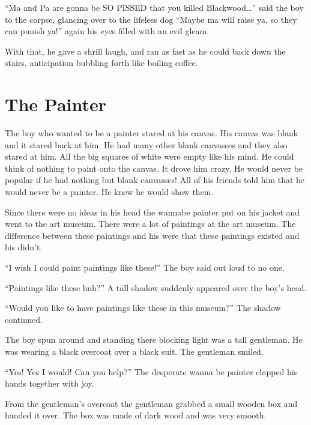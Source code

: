 ``Ma and Pa are gonna be SO PISSED that you killed Blackwood{\ldots}''
said the boy to the corpse, glancing over to the lifeless dog
``Maybe ma will raise ya, so they can punish ya!'' again his eyes
filled with an evil gleam.

With that, he gave a shrill laugh, and ran as fast as he could back
down the stairs, anticipation bubbling forth like boiling coffee. 

 



\chapter{The Painter}





The boy who wanted to be a painter stared at his canvas. His canvas
was blank and it stared back at him. He had many other blank
canvasses and they also stared at him. All the big squares of white
were empty like his mind. He could think of nothing to paint onto
the canvas. It drove him crazy. He would never be popular if he had
nothing but blank canvasses! All of his friends told him that he
would never be a painter. He knew he would show them.



Since there were no ideas in his head the wannabe painter put on
his jacket and went to the art museum. There were a lot of
paintings at the art museum. The difference between these paintings
and his were that these paintings existed and his didn't.

``I wish I could paint paintings like these!'' The boy said out loud
to no one.

``Paintings like these huh?'' A tall shadow suddenly appeared over
the boy's head.

``Would you like to have paintings like these in this museum?'' The
shadow continued.

The boy spun around and standing there blocking light was a tall
gentleman. He was wearing a black overcoat over a black suit. The
gentleman smiled.

``Yes! Yes I would! Can you help?'' The desperate wanna be painter
clapped his hands together with joy.

From the gentleman's overcoat the gentleman grabbed a small wooden
box and handed it over. The box was made of dark wood and was very
smooth.

